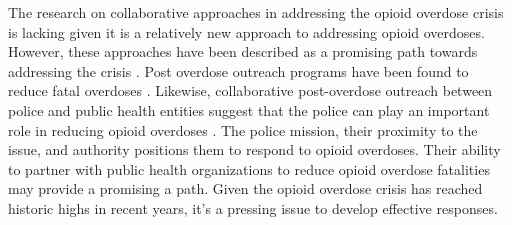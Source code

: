 The research on collaborative approaches in addressing the opioid overdose crisis is lacking given it is a relatively new approach to addressing opioid overdoses. However, these approaches have been described as a promising path towards addressing the crisis \parencite{haegerich_evidence_2019, yatsco_alternatives_2020}. Post overdose outreach programs have been found to reduce fatal overdoses \parencite{xuan_association_2023}. Likewise, collaborative post-overdose outreach between police and public health entities suggest that the police can play an important role in reducing opioid overdoses \parencite{donnelly_law_2022}. The police mission, their proximity to the issue, and authority positions them to respond to opioid overdoses. Their ability to partner with public health organizations to reduce opioid overdose fatalities may provide a promising a path. Given the opioid overdose crisis has reached historic highs in recent years, it’s a pressing issue to develop effective responses. 

